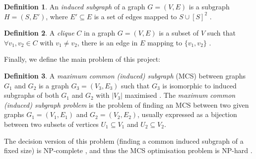 \documentclass{l4proj}
\theoremstyle{definition}
\newtheorem{definition}{Definition}[chapter]
\theoremstyle{remark}
\begin{document}
\begin{definition} \label{def:induced_subgraph}
  An \emph{induced subgraph} of a graph $G = (V, E)$ is a subgraph $H = (S,
  E')$, where $E' \subseteq E$ is a set of edges mapped to $S \cup [S]^2$
  \cite{DBLP:journals/jcamd/RaymondW02a}.
\end{definition}

\begin{definition}
  A \emph{clique} $C$ in a graph $G = (V, E)$ is a subset of $V$ such that
  $\forall v_1, v_2 \in C$ with $v_1 \ne v_2$, there is an edge in $E$ mapping
  to $\{ v_1, v_2 \}$ \cite{DBLP:journals/jgo/PardalosX94a}.
\end{definition}
Finally, we define the main problem of this project:

\begin{definition}
  A \emph{maximum common (induced) subgraph} (MCS) between graphs $G_1$ and
  $G_2$ is a graph $G_3 = (V_3, E_3)$ such that $G_3$ is isomorphic to induced
  subgraphs of both $G_1$ and $G_2$ with $|V_3|$ maximised
  \cite{DBLP:journals/jcamd/RaymondW02a}. The \emph{maximum common (induced)
    subgraph problem} is the problem of finding an MCS between two given graphs
  $G_1 = (V_1, E_1)$ and $G_2 = (V_2, E_2)$, usually expressed as a bijection
  between two subsets of vertices $U_1 \subseteq V_1$ and $U_2 \subseteq V_2$.
\end{definition}
The decision version of this problem (finding a common induced subgraph of a
fixed size) is NP-complete \cite{DBLP:journals/bmcbi/HuangLJ06}, and thus the
MCS optimisation problem is NP-hard \cite{DBLP:conf/ijcai/McCreeshPT17,
  DBLP:books/ph/PapadimitriouS82}.
\end{document}
